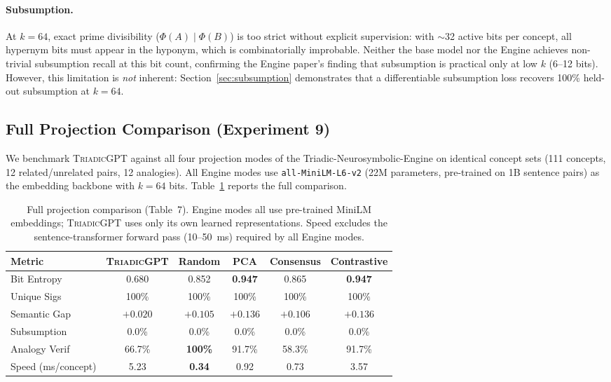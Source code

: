 \documentclass[11pt,a4paper]{article}
\newcommand{\microgpt}{\textsc{TriadicGPT}}
\begin{document}
\paragraph{Subsumption.} At $k=64$, exact prime divisibility ($\Phi(A) \mid \Phi(B)$) is too strict without explicit supervision: with $\sim$32 active bits per concept, all hypernym bits must appear in the hyponym, which is combinatorially improbable. Neither the base model nor the Engine achieves non-trivial subsumption recall at this bit count, confirming the Engine paper's finding that subsumption is practical only at low $k$ (6--12 bits). However, this limitation is \emph{not} inherent: Section~\ref{sec:subsumption} demonstrates that a differentiable subsumption loss recovers 100\% held-out subsumption at $k=64$.


\subsection{Full Projection Comparison (Experiment 9)}
\label{sec:comparison}

We benchmark \microgpt{} against all four projection modes of the Triadic-Neurosymbolic-Engine on identical concept sets (111 concepts, 12 related/unrelated pairs, 12 analogies). All Engine modes use \texttt{all-MiniLM-L6-v2} (22M parameters, pre-trained on 1B sentence pairs) as the embedding backbone with $k=64$ bits. Table~\ref{tab:comparison} reports the full comparison.

\begin{table}[h]
\centering
\caption{Full projection comparison (Table~7). Engine modes all use pre-trained MiniLM embeddings; \microgpt{} uses only its own learned representations. Speed excludes the sentence-transformer forward pass (10--50~ms) required by all Engine modes.}
\label{tab:comparison}
\begin{tabular}{lccccc}
\toprule
Metric & \microgpt{} & Random & PCA & Consensus & Contrastive \\
\midrule
Bit Entropy       & 0.680 & 0.852 & \textbf{0.947} & 0.865 & \textbf{0.947} \\
Unique Sigs       & 100\% & 100\% & 100\% & 100\% & 100\% \\
Semantic Gap      & $+0.020$ & $+0.105$ & $\mathbf{+0.136}$ & $+0.106$ & $\mathbf{+0.136}$ \\
Subsumption       & 0.0\% & 0.0\% & 0.0\% & 0.0\% & 0.0\% \\
Analogy Verif     & 66.7\% & \textbf{100\%} & 91.7\% & 58.3\% & 91.7\% \\
Speed (ms/concept)& 5.23  & \textbf{0.34}  & 0.92  & 0.73  & 3.57  \\
\bottomrule
\end{tabular}
\end{table}
\end{document}
